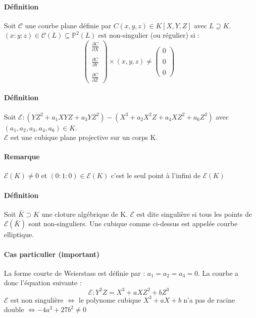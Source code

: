 \documentclass[12pt,a4paper]{report}
\begin{document}
\paragraph{Définition\\}
Soit $\mathcal{C}$ une courbe plane définie par $ C(x,y,z) \in K[X,Y,Z] $ avec $L\supseteq K$. $(x:y:z) \in \mathcal{C}(L) \subseteq \mathbb{P}^2(L)$ est non-singulier (ou régulier) si :
$$ \left(
\begin{array}{c}
   \displaystyle \frac{\partial C}{\partial X} \\
   \\
    \displaystyle\frac{\partial C}{\partial Y}  \\
    \\
   \displaystyle \frac{\partial C}{\partial Z} 
\end{array}
\right)\times (x,y,z) \neq \left(
\begin{array}{c}
   \displaystyle 0 \\
   \\
    \displaystyle 0  \\
    \\
   \displaystyle 0 
\end{array}
\right)$$
\paragraph{Définition\\}
Soit $\mathcal{E}:(YZ^2+a_1XYZ+a_3YZ^2)-(X^3+a_2X^2Z+a_4XZ^2+a_6Z^3)$ avec $(a_1,a_2,a_3,a_4,a_6) \in K $.\\
$\mathcal{E}$ est une cubique plane projective sur un corps K.
\paragraph{Remarque\\}
$\mathcal{E}(K) \neq 0$ et $(0:1:0) \in \mathcal{E}(K)$ c'est le seul point à  l'infini de $\mathcal{E}(K)$
\paragraph{Définition\\}
Soit $\bar{K} \supset K$ une cloture algébrique de K. $\mathcal{E} $ est dite singulière si tous les points de $\mathcal{E}(\bar{K})$ sont non-singuliers. Une cubique comme ci-dessus est appelée courbe elliptique. 
\paragraph{Cas particulier (important)\\}
La forme courte de Weierstass est définie par : $a_1=a_2=a_3=0 $. La courbe a donc l'équation suivante :
$$ \mathcal{E} : Y^2Z=X^3+aXZ^2+bZ^3 $$
$ \mathcal{E}$ est non singulière $ \Longleftrightarrow $ le polynome cubique $ X^3+aX+b$ n'a pas de racine double 
$\Longleftrightarrow -4a^3+27b^2 \neq 0 $
\end{document}
